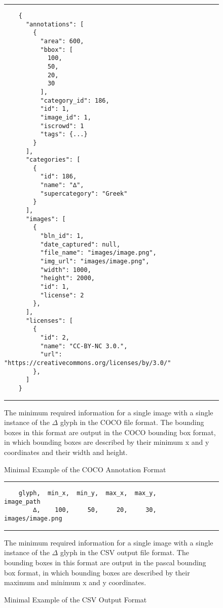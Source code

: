 \begin{figure}
  \caption{Minimal Example of the COCO Annotation Format}
  \label{fig:coco}
  \par\noindent\rule{\textwidth}{0.5pt}
  \begin{\codefigsize}
  \begin{lstlisting}
    {
      "annotations": [
        {
          "area": 600,
          "bbox": [
            100,
            50,
            20,
            30
          ],
          "category_id": 186,
          "id": 1,
          "image_id": 1,
          "iscrowd": 1
          "tags": {...}
        }
      ],
      "categories": [
        {
          "id": 186,
          "name": "∆",
          "supercategory": "Greek"
        }
      ],
      "images": [
        {
          "bln_id": 1,
          "date_captured": null,
          "file_name": "images/image.png",
          "img_url": "images/image.png",
          "width": 1000,
          "height": 2000,
          "id": 1,
          "license": 2
        },
      ],
      "licenses": [
        {
          "id": 2,
          "name": "CC-BY-NC 3.0.",
          "url": "https://creativecommons.org/licenses/by/3.0/"
        },
      ]
    }
  \end{lstlisting}
  \end{\codefigsize}
  \par\noindent\rule{\textwidth}{0.5pt}
  The minimum required information for a single image with a single instance of the $\Delta$ glyph in the COCO file format. The bounding boxes in this format are output in the COCO bounding box format, in which bounding boxes are described by their minimum x and y coordinates and their width and height.
\end{figure}

\begin{figure}
  \caption{Minimal Example of the CSV Output Format}
  \label{fig:csv_output}
  \par\noindent\rule{\textwidth}{0.5pt}
  \begin{\codefigsize}
  \begin{lstlisting}
    glyph,  min_x,  min_y,  max_x,  max_y,        image_path
        ∆,    100,     50,     20,     30,  images/image.png
  \end{lstlisting}
  \end{\codefigsize}
  \par\noindent\rule{\textwidth}{0.5pt}
  The minimum required information for a single image with a single instance of the $\Delta$ glyph in the CSV output file format. The bounding boxes in this format are output in the pascal bounding box format, in which bounding boxes are described by their maximum and minimum x and y coordinates.
\end{figure}
